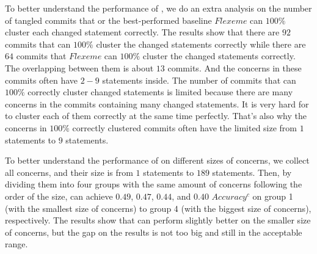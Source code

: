 To better understand the performance of \tool, we do an extra analysis on the number of tangled commits that \tool or the best-performed baseline $Flexeme$ can $100\%$ cluster each changed statement correctly. The results show that there are $92$ commits that \tool can $100\%$ cluster the changed statements correctly while there are $64$ commits that $Flexeme$ can $100\%$ cluster the changed statements correctly. The overlapping between them is about $13$ commits. And the concerns in these commits often have $2-9$ statements inside. The number of commits that \tool can $100\%$ correctly cluster changed statements is limited because there are many concerns in the commits containing many changed statements. It is very hard for \tool to cluster each of them correctly at the same time perfectly. That's also why the concerns in $100\%$ correctly clustered commits often have the limited size from $1$ statements to $9$ statements. 

To better understand the performance of \tool on different sizes of concerns, we collect all concerns, and their size is from $1$ statements to $189$ statements. Then, by dividing them into four groups with the same amount of concerns following the order of the size, \tool can achieve $0.49$, $0.47$, $0.44$, and $0.40$ $Accuracy^c$ on group 1 (with the smallest size of concerns) to group 4 (with the biggest size of concerns), respectively. The results show that \tool can perform slightly better on the smaller size of concerns, but the gap on the results is not too big and still in the acceptable range.